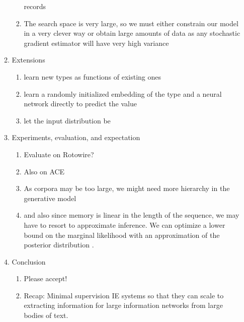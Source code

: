 \documentclass[11pt]{article}
\begin{document}
\begin{enumerate}
\begin{enumerate}
\begin{enumerate}
            records
        \item The search space is very large, so we must either constrain our model 
            in a very clever way or obtain 
            large amounts of data as any stochastic gradient estimator will have very high variance
        \end{enumerate}
    \item Extensions
        \begin{enumerate}
        \item learn new types as functions of existing ones
        \item learn a randomly initialized embedding of the type
            and a neural network directly to predict the value
        \item let the input distribution be 
        \end{enumerate}
    \item Experiments, evaluation, and expectation
        \begin{enumerate}
        \item Evaluate on Rotowire?
        \item Also on ACE
        \item As corpora may be too large, we might need more hierarchy in the generative model
        \item and also since memory is linear in the length of the sequence, we may have
            to resort to approximate inference. We can optimize a lower bound
            on the marginal likelihood with an approximation of the
            posterior distribution \citep{deng2018attn}.
        \end{enumerate}
    \item Conclusion
        \begin{enumerate}
        \item Please accept!
        \item Recap: Minimal supervision IE systems so that they can scale to
            extracting information for large information networks from large bodies of text.
        \end{enumerate}
    \end{enumerate}
\end{enumerate}



\end{document}
